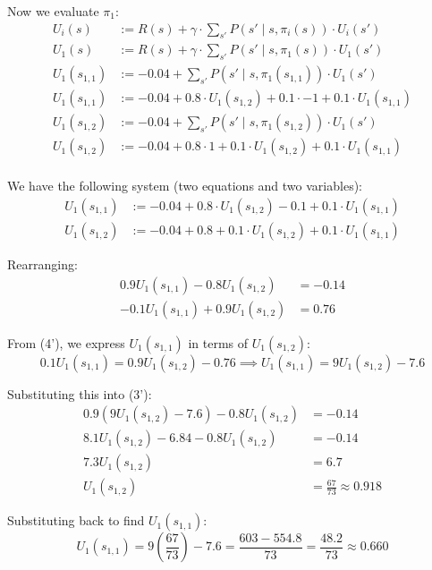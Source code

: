 Now we evaluate $\pi_1$:
\begin{align*}
U_i(s) &:= R(s) + \gamma \cdot \sum_{s'} P(s' \mid s, \pi_i(s)) \cdot U_i(s') \\ 
U_1(s) &:= R(s) + \gamma \cdot \sum_{s'} P(s' \mid s, \pi_1(s)) \cdot U_1(s') \\ 
U_1(s_{1,1}) &:= -0.04 + \sum_{s'} P(s' \mid s, \pi_1(s_{1,1})) \cdot U_1(s') \\
U_1(s_{1,1}) &:= -0.04 + 0.8 \cdot U_1(s_{1,2}) + 0.1 \cdot -1 + 0.1 \cdot U_1(s_{1,1}) \\ 
U_1(s_{1,2}) &:= -0.04 + \sum_{s'} P(s' \mid s, \pi_1(s_{1,2})) \cdot U_1(s') \\
U_1(s_{1,2}) &:= -0.04 + 0.8 \cdot 1 + 0.1 \cdot U_1(s_{1,2}) + 0.1 \cdot U_1(s_{1,1}) \\
\end{align*}


We have the following system (two equations and two variables):
\begin{align}
    U_1(s_{1,1}) &:= -0.04 + 0.8 \cdot U_1(s_{1,2}) - 0.1 + 0.1 \cdot U_1(s_{1,1}) \label{eq3} \\
    U_1(s_{1,2}) &:= -0.04 + 0.8 + 0.1 \cdot U_1(s_{1,2}) + 0.1 \cdot U_1(s_{1,1}) \label{eq4}
\end{align}


Rearranging:
\begin{align}
    0.9 U_1(s_{1,1}) - 0.8 U_1(s_{1,2}) &= -0.14 \tag{3'} \\
    -0.1 U_1(s_{1,1}) + 0.9 U_1(s_{1,2}) &= 0.76 \tag{4'}
\end{align}

From (4'), we express $U_1(s_{1,1})$ in terms of $U_1(s_{1,2})$:
\begin{equation*}
    0.1 U_1(s_{1,1}) = 0.9 U_1(s_{1,2}) - 0.76 \implies U_1(s_{1,1}) = 9 U_1(s_{1,2}) - 7.6
\end{equation*}

Substituting this into (3'):
\begin{align*}
    0.9(9 U_1(s_{1,2}) - 7.6) - 0.8 U_1(s_{1,2}) &= -0.14 \\
    8.1 U_1(s_{1,2}) - 6.84 - 0.8 U_1(s_{1,2}) &= -0.14 \\
    7.3 U_1(s_{1,2}) &= 6.7 \\
    U_1(s_{1,2}) &= \frac{67}{73} \approx 0.918
\end{align*}

Substituting back to find $U_1(s_{1,1})$:
\begin{equation*}
    U_1(s_{1,1}) = 9\left(\frac{67}{73}\right) - 7.6 = \frac{603 - 554.8}{73} = \frac{48.2}{73} \approx 0.660
\end{equation*}

